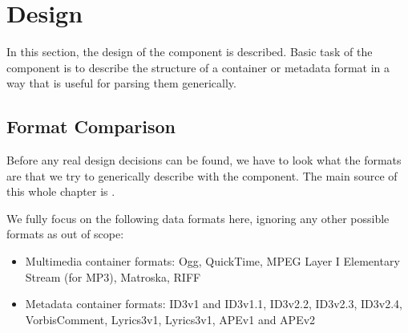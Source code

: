 
\section{\COMPdataFormatManagement{} Design}
\label{sec:COMPdataFormatsDesign}

In this section, the design of the component \COMPdataFormatManagement{} is described. Basic task of the component is to describe the structure of a container or metadata format in a way that is useful for parsing them generically.

\subsection{Format Comparison}%
\label{sec:FormatComparison}%

Before any real design decisions can be found, we have to look what the formats are that we try to generically describe with the \COMPdataFormatManagement{} component. The main source of this whole chapter is \cite{MC17}.

We fully focus on the following data formats here, ignoring any other possible formats as out of scope:
\begin{itemize}
\item Multimedia container formats: Ogg, QuickTime, MPEG Layer I Elementary Stream (for MP3), Matroska, RIFF
\item Metadata container formats: ID3v1 and ID3v1.1, ID3v2.2, ID3v2.3, ID3v2.4, VorbisComment, Lyrics3v1, Lyrics3v1, APEv1 and APEv2
\end{itemize}

